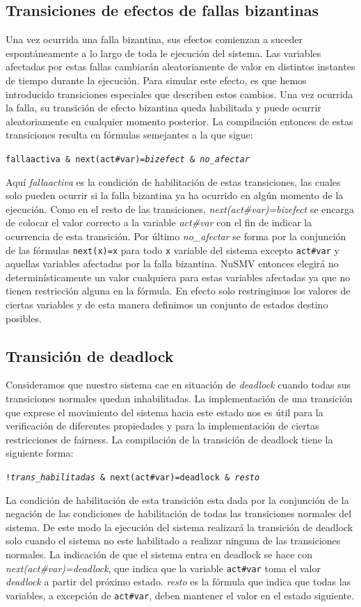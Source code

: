 \documentclass[pdftex,a4paper,12pt]{book}
\newcommand{\textff}[1]{\begin{center}\texttt{#1}\end{center}}
\newcommand{\etextit}[1]{\textnormal{\textit{#1}}}
\begin{document}
\subsection*{Transiciones de efectos de fallas bizantinas}
Una vez ocurrida una falla bizantina, sus efectos comienzan a suceder espont\'aneamente a lo largo de toda le ejecuci\'on del sistema. Las variables afectadas por estas fallas cambiar\'an aleatoriamente de valor en distintos instantes de tiempo durante la ejecuci\'on. Para simular este efecto, es que hemos introducido transiciones especiales que describen estos cambios. Una vez ocurrida la falla, su transici\'on de efecto bizantina queda habilitada y puede ocurrir aleatoriamente en cualquier momento posterior. La compilaci\'on entonces de estas transiciones resulta en f\'ormulas semejantes a la que sigue:
\textff{fallaactiva~\&~next(act\#var)=\etextit{bizefect}~\&~\etextit{no\_afectar}}
Aqu\'i \textit{fallaactiva} es la condici\'on de habilitaci\'on de estas transiciones, las cuales solo pueden ocurrir si la falla bizantina ya ha ocurrido en alg\'un momento de la ejecuci\'on. Como en el resto de las transiciones, \textit{next(act\#var)=bizefect} se encarga de colocar el valor correcto a la variable \textit{act\#var} con el fin de indicar la ocurrencia de esta transici\'on. Por \'ultimo \textit{no\_afectar} se forma por la conjunci\'on de las f\'ormulas \texttt{next(x)=x} para todo \texttt{x} variable del sistema excepto \texttt{act\#var} y aquellas variables afectadas por la falla bizantina. NuSMV entonces elegir\'a no determin\'isticamente un valor cualquiera para estas variables afectadas ya que no tienen restricci\'on alguna en la f\'ormula. En efecto solo restringimos los valores de ciertas variables y de esta manera definimos un conjunto de estados destino posibles.

\subsection*{Transici\'on de deadlock}
Consideramos que nuestro sistema cae en situaci\'on de \textit{deadlock} cuando todas sus transiciones normales quedan inhabilitadas. La implementaci\'on de una transici\'on que exprese el movimiento del sistema hacia este estado nos es \'util para la verificaci\'on de diferentes propiedades y para la implementaci\'on de ciertas restricciones de fairness. La compilaci\'on de la transici\'on de deadlock tiene la siguiente forma:
\textff{!\etextit{trans\_habilitadas}~\&~next(act\#var)=deadlock~\&~\etextit{resto}}
La condici\'on de habilitaci\'on de esta transici\'on esta dada por la conjunci\'on de la negaci\'on de las condiciones de habilitaci\'on de todas las transiciones normales del sistema. De este modo la ejecuci\'on del sistema realizar\'a la transici\'on de deadlock solo cuando el sistema no este habilitado a realizar ninguna de las transiciones normales. La indicaci\'on de que el sistema entra en deadlock se hace con \textit{next(act\#var)=deadlock}, que indica que la variable \texttt{act\#var} toma el valor \textit{deadlock} a partir del pr\'oximo estado. \textit{resto} es la f\'ormula que indica que todas las variables, a excepci\'on de \texttt{act\#var}, deben mantener el valor en el estado siguiente.
\end{document}
